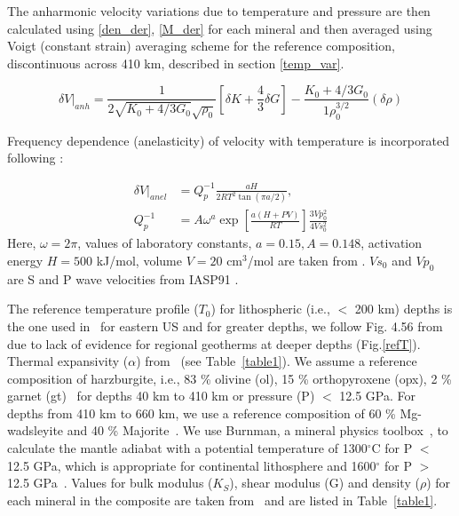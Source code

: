 \documentclass[draft,linenumbers]{agujournal2018}
\begin{document}
The anharmonic velocity variations due to temperature and pressure are then calculated using \ref{den_der}, \ref{M_der} for each mineral and then averaged using Voigt (constant strain) averaging scheme for the reference composition, discontinuous across 410 km,  described in section \ref{temp_var}.

\begin{equation} \label{anh}
    \delta V \vert_{anh} = \frac{1}{2\sqrt{K_0 + 4/3 G_0} \sqrt{\rho_0}} \left[\delta K + \frac{4}{3} \delta G \right] - \frac{K_0 + 4/3 G_0}{1\rho_0^{3/2}} ( \delta \rho)
\end{equation} 

Frequency dependence (anelasticity) of velocity with temperature is incorporated following \citet{Goes_2000}:

\begin{align} \label{anel}
    \delta V \vert_{anel} &= Q_p^{-1} \frac{aH}{2 R T^2 \tan(\pi a/2)},\\
    Q_p^{-1} &= A \omega^{a} \exp \left[ \frac{a(H+PV)}{RT} \right] \frac{3Vp_{0}^{2}}{4Vs_{0}^{2}} \nonumber
\end{align}
Here, $\omega = 2\pi $, values of laboratory constants, $a = 0.15, A = 0.148$, activation energy $H = 500$ kJ/mol, volume $V = 20$ cm$^3$/mol are taken from \citet{sobolev1996upper}. $Vs_0$ and $Vp_0$ are S and P wave velocities from IASP91 \citep{kennett1991traveltimes}.

The reference temperature profile ($T_0$) for lithospheric (i.e., $<$ 200 km) depths is the one used in~\citep{Goes_2002} for eastern US and for greater depths, we follow Fig. 4.56 from~\citet{turcotte2014geodynamics} due to lack of evidence for regional geotherms at deeper depths (Fig.\ref{refT}). Thermal expansivity ($\alpha$) from~\citet{saxena_data} (see Table~\ref{table1}). We assume a reference composition of harzburgite, i.e., 83 \% olivine (ol), 15 \% orthopyroxene (opx), 2 \% garnet (gt)~\citep{mcdonough1998mineralogy} for depths 40 km to 410 km or pressure (P) $<$ 12.5 GPa. For depths from 410 km to 660 km, we use a reference composition of 60 \% Mg-wadsleyite and 40 \% Majorite~\citep{haggerty1995upper}. We use Burnman, a mineral physics toolbox~\citep{cottaar2014burnman}, to calculate the mantle adiabat with a potential temperature of 1300$^{\circ}$C for P $<$ 12.5 GPa, which is appropriate for continental lithosphere \citep{rudnick1998thermal} and 1600$^{\circ}$ for P $>$ 12.5 GPa~\citep{katsura2010adiabatic}. Values for bulk modulus ($K_S$), shear modulus (G) and density ($\rho$) for each mineral in the composite are taken from~\citet{Cammarano2003} and are listed in Table~\ref{table1}.
\end{document}
